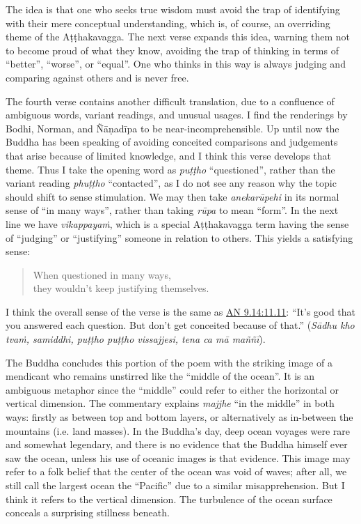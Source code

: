 \documentclass[12pt,openany]{book}%
\begin{document}
The idea is that one who seeks true wisdom must avoid the trap of identifying with their mere conceptual understanding, which is, of course, an overriding theme of the \textsanskrit{Aṭṭhakavagga}. The next verse expands this idea, warning them not to become proud of what they know, avoiding the trap of thinking in terms of “better”, “worse”, or “equal”. One who thinks in this way is always judging and comparing against others and is never free.

The fourth verse contains another difficult translation, due to a confluence of ambiguous words, variant readings, and unusual usages. I find the renderings by Bodhi, Norman, and \textsanskrit{Ñāṇadīpa} to be near-incomprehensible. Up until now the Buddha has been speaking of avoiding conceited comparisons and judgements that arise because of limited knowledge, and I think this verse develops that theme. Thus I take the opening word as \textit{\textsanskrit{puṭṭho}} “questioned”, rather than the variant reading \textit{\textsanskrit{phuṭṭho}} “contacted”, as I do not see any reason why the topic should shift to sense stimulation. We may then take \textit{\textsanskrit{anekarūpehi}} in its normal sense of “in many ways”, rather than taking \textit{\textsanskrit{rūpa}} to mean “form”. In the next line we have \textit{\textsanskrit{vikappayaṁ}}, which is a special \textsanskrit{Aṭṭhakavagga} term having the sense of “judging” or “justifying” someone in relation to others. This yields a satisfying sense:

\begin{verse}%
When questioned in many ways, \\
they wouldn’t keep justifying themselves.

%
\end{verse}

I think the overall sense of the verse is the same as \href{https://suttacentral.net/an9.14/en/sujato\#11.11}{AN 9.14:11.11}: “It’s good that you answered each question. But don’t get conceited because of that.” (\textit{\textsanskrit{Sādhu} kho \textsanskrit{tvaṁ}, samiddhi, \textsanskrit{puṭṭho} \textsanskrit{puṭṭho} vissajjesi, tena ca \textsanskrit{mā} \textsanskrit{maññī}}).

The Buddha concludes this portion of the poem with the striking image of a mendicant who remains unstirred like the “middle of the ocean”. It is an ambiguous metaphor since the “middle” could refer to either the horizontal or vertical dimension. The commentary explains \textit{majjhe} “in the middle” in both ways: firstly as between top and bottom layers, or alternatively as in-between the mountains (i.e. land masses). In the Buddha’s day, deep ocean voyages were rare and somewhat legendary, and there is no evidence that the Buddha himself ever saw the ocean, unless his use of oceanic images is that evidence. This image may refer to a folk belief that the center of the ocean was void of waves; after all, we still call the largest ocean the “Pacific” due to a similar misapprehension. But I think it refers to the vertical dimension. The turbulence of the ocean surface conceals a surprising stillness beneath.
\end{document}
